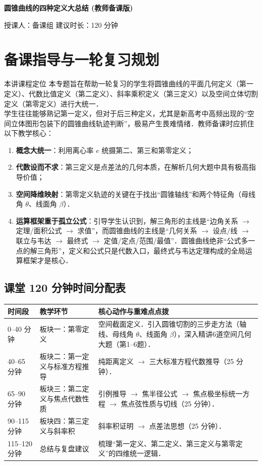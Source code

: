 \documentclass[11pt,a4paper]{ctexart}
\newcommand{\lessoninfo}[2]{%
  \begin{center}
    {\LARGE\bfseries #1 \quad (教师备课版)}\par
    \vspace{0.8em}
    {\small 授课人：#2 \quad 建议时长：120 分钟}
  \end{center}
  \vspace{0.6em}
}
\begin{document}
\lessoninfo{圆锥曲线的四种定义大总结}{备课组}

\section{备课指导与一轮复习规划}

\begin{teachbox}{本讲课程定位}
本专题旨在帮助一轮复习的学生将圆锥曲线的平面几何定义（第一定义）、代数比值定义（第二定义）、斜率乘积定义（第三定义）以及空间立体切割定义（第零定义）进行大统一．\\
学生往往能够熟记第一定义，但对于后三种定义，尤其是新高考中高频出现的“空间立体图形包装下的圆锥曲线轨迹判断”，极易产生畏难情绪．教师备课时应抓住以下教学核心：
\begin{enumerate}
  \item \textbf{概念大统一}：利用离心率 $e$ 统摄第二、第三和第零定义；
  \item \textbf{代数设而不求}：第三定义是点差法的几何本质，在解析几何大题中具有极高指导价值；
  \item \textbf{空间降维映射}：第零定义轨迹的关键在于找出“圆锥轴线”和两个特征角（母线角 $\theta$、线面角 $\beta$）．
  \item \textbf{运算框架重于孤立公式}：引导学生认识到，解三角形的主线是“边角关系 $\to$ 定理/面积公式 $\to$ 求值”，而圆锥曲线的主线是“几何关系 $\to$ 设点/线 $\to$ 联立与韦达 $\to$ 最终式 $\to$ 定值/定点/范围/最值”．圆锥曲线绝非“公式多一点的解三角形”，定义和公式只是代数入口，最终式与韦达定理构成的全局运算框架才是核心．
\end{enumerate}
\end{teachbox}

\subsection*{课堂 120 分钟时间分配表}
\begin{tabularx}{\textwidth}{p{2.2cm}p{3.0cm}X}
\toprule
时间段 & 教学环节 & 核心动作与重难点点拨\\
\midrule
0--40 分钟 & 板块一：第零定义 & 空间截面定义．引入圆锥切割的三步走方法（轴线、母线角 $\theta$、线面角 $\beta$），深入精讲6道空间几何大题（第1--6题）．\\ \hline
40--65 分钟 & 板块二：第一定义与标准方程推导 & 纯距离定义 $\to$ 三大标准方程代数推导（25 分钟）．\\ \hline
65--90 分钟 & 板块三：第二定义与焦点代数性质 & 引例推导 $\to$ 焦半径公式 $\to$ 焦点极坐标统一方程 $\to$ 焦点弦性质与切线（25 分钟）．\\ \hline
90--115 分钟 & 板块四：第三定义与斜率积 & 斜率积证明 $\to$ 点差法思想（25 分钟）．\\ \hline
115--120 分钟 & 总结与复盘建议 & 梳理“第一定义、第二定义、第三定义与第零定义”的四维统一逻辑．\\
\bottomrule
\end{tabularx}
\end{document}
